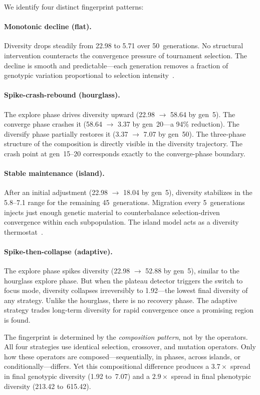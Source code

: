 \documentclass[sigconf]{acmart}
\begin{document}
We identify four distinct fingerprint patterns:

\paragraph{Monotonic decline (flat).}
Diversity drops steadily from 22.98 to 5.71 over 50~generations. No structural intervention counteracts the convergence pressure of tournament selection. The decline is smooth and predictable---each generation removes a fraction of genotypic variation proportional to selection intensity~\cite{blickle1996comparison, crepinsek2013exploration}.

\paragraph{Spike-crash-rebound (hourglass).}
The explore phase drives diversity upward (22.98 $\to$ 58.64 by gen~5). The converge phase crashes it (58.64 $\to$ 3.37 by gen~20---a 94\% reduction). The diversify phase partially restores it (3.37 $\to$ 7.07 by gen~50). The three-phase structure of the composition is directly visible in the diversity trajectory. The crash point at gen~15--20 corresponds exactly to the converge-phase boundary.

\paragraph{Stable maintenance (island).}
After an initial adjustment (22.98 $\to$ 18.04 by gen~5), diversity stabilizes in the 5.8--7.1 range for the remaining 45~generations. Migration every 5~generations injects just enough genetic material to counterbalance selection-driven convergence within each subpopulation. The island model acts as a diversity thermostat~\cite{whitley1999island}.

\paragraph{Spike-then-collapse (adaptive).}
The explore phase spikes diversity (22.98 $\to$ 52.88 by gen~5), similar to the hourglass explore phase. But when the plateau detector triggers the switch to focus mode, diversity collapses irreversibly to 1.92---the lowest final diversity of any strategy. Unlike the hourglass, there is no recovery phase. The adaptive strategy trades long-term diversity for rapid convergence once a promising region is found.

The fingerprint is determined by the \emph{composition pattern}, not by the operators.
All four strategies use identical selection, crossover, and mutation operators.
Only how these operators are composed---sequentially, in phases, across islands, or conditionally---differs.
Yet this compositional difference produces a $3.7\times$ spread in final genotypic diversity (1.92 to~7.07) and a $2.9\times$ spread in final phenotypic diversity (213.42 to~615.42).
\end{document}
